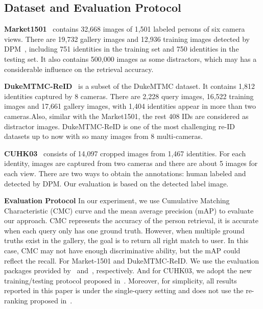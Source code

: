 \documentclass[letterpaper]{article} \usepackage{aaai19}  \usepackage{times}  \usepackage{helvet}  \usepackage{courier}  \usepackage{url}  \usepackage{graphicx}  \frenchspacing  \setlength{\pdfpagewidth}{8.5in}  \setlength{\pdfpageheight}{11in}  \usepackage{multirow}
\begin{document}
\subsection{Dataset and Evaluation Protocol}
{\bf Market1501}~\cite{zheng2015scalable} contains 32,668 images of 1,501 labeled persons of six camera views. There are 19,732 gallery images and 12,936 training images detected by DPM~\cite{felzenszwalb2010object}, including 751 identities in the training set and 750 identities in the testing set. It also contains 500,000 images as some distractors, which may has a considerable influence on the retrieval accuracy.

{\bf DukeMTMC-ReID}~\cite{ristani2016performance,zheng2017unlabeled} is a subset of the DukeMTMC dataset. It contains 1,812 identities captured by 8 cameras. There are 2,228 query images, 16,522 training images and 17,661 gallery images, with 1,404 identities appear in more than two cameras.Also, similar with the Market1501, the rest 408 IDs are considered as distractor images. DukeMTMC-ReID is one of the most challenging re-ID datasets up to now with so many images from 8 multi-cameras.

{\bf CUHK03}~\cite{li2014deepreid} consists of 14,097 cropped images from 1,467 identities. For each identity, images are captured from two cameras and there are about 5 images for each view. There are two ways to obtain the annotations: human labeled and detected by DPM. Our evaluation is based on the detected label image.

{\bf Evaluation Protocol}
In our experiment, we use Cumulative Matching Characteristic (CMC) curve and the mean average precision (mAP) to evaluate our approach. CMC represents the accuracy of the person retrieval, it is accurate when each query only has one ground truth. However, when multiple ground truths exist in the gallery, the goal is to return all right match to user. In this case, CMC may not have enough discriminative ability, but the mAP could reflect the recall. For Market-1501 and DukeMTMC-ReID. We use the evaluation packages provided by~\cite{zheng2015scalable} and~\cite{zheng2017unlabeled}, respectively. And for CUHK03, we adopt the new training/testing protocol proposed in~\cite{zhong2017re}. Moreover, for simplicity, all results reported in this paper is under the single-query setting and does not use the re-ranking proposed in~\cite{zhong2017re}. 
\end{document}
